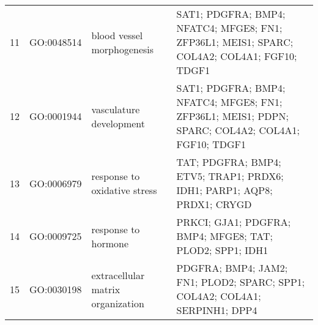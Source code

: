 \documentclass[10pt,letterpaper]{article}
\begin{document}
\begin{table}[!hp]
\begin{adjustwidth}{-.5in}{0in}
\begin{tabular}{|c|c|p{1.5in}|p{4in}|}
11 & GO:0048514 & blood vessel morphogenesis & \footnotesize{SAT1; PDGFRA; BMP4; NFATC4; MFGE8; FN1; ZFP36L1; MEIS1; SPARC; COL4A2; COL4A1; FGF10; TDGF1} \\
12 & GO:0001944 & vasculature development & \footnotesize{SAT1; PDGFRA; BMP4; NFATC4; MFGE8; FN1; ZFP36L1; MEIS1; PDPN; SPARC; COL4A2; COL4A1; FGF10; TDGF1} \\
13 & GO:0006979 & response to oxidative stress & \footnotesize{TAT; PDGFRA; BMP4; ETV5; TRAP1; PRDX6; IDH1; PARP1; AQP8; PRDX1; CRYGD} \\
14 & GO:0009725 & response to hormone & \footnotesize{PRKCI; GJA1; PDGFRA; BMP4; MFGE8; TAT; PLOD2; SPP1; IDH1} \\
15 & GO:0030198 & extracellular matrix organization & \footnotesize{PDGFRA; BMP4; JAM2; FN1; PLOD2; SPARC; SPP1; COL4A2; COL4A1; SERPINH1; DPP4} \\

\end{tabular}
\end{adjustwidth}
\end{table}
\end{document}
